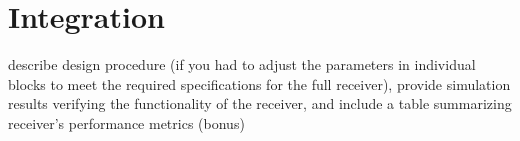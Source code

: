\section{Integration}
describe design procedure (if you had to adjust the parameters in individual blocks to meet the required specifications for the full receiver), provide simulation results verifying the functionality of the receiver, and include a table summarizing receiver’s performance metrics (bonus) 
